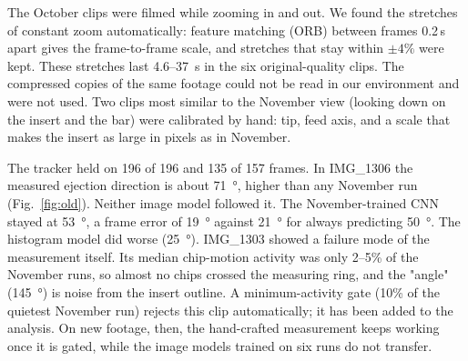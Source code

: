 \documentclass[conference,a4paper]{IEEEtran}
\begin{document}
The October clips were filmed while zooming in and out.
We found the stretches of constant zoom automatically: feature matching (ORB) between frames 0.2\,s apart gives the frame-to-frame scale, and stretches that stay within $\pm4\%$ were kept.
These stretches last 4.6--\SI{37}{s} in the six original-quality clips.
The compressed copies of the same footage could not be read in our environment and were not used.
Two clips most similar to the November view (looking down on the insert and the bar) were calibrated by hand: tip, feed axis, and a scale that makes the insert as large in pixels as in November.

The tracker held on 196 of 196 and 135 of 157 frames.
In IMG\_1306 the measured ejection direction is about \SI{71}{\degree}, higher than any November run (Fig.~\ref{fig:old}).
Neither image model followed it.
The November-trained CNN stayed at \SI{53}{\degree}, a frame error of \SI{19}{\degree} against \SI{21}{\degree} for always predicting \SI{50}{\degree}.
The histogram model did worse (\SI{25}{\degree}).
IMG\_1303 showed a failure mode of the measurement itself.
Its median chip-motion activity was only 2--5\% of the November runs, so almost no chips crossed the measuring ring, and the "angle" (\SI{145}{\degree}) is noise from the insert outline.
A minimum-activity gate (10\% of the quietest November run) rejects this clip automatically; it has been added to the analysis.
On new footage, then, the hand-crafted measurement keeps working once it is gated, while the image models trained on six runs do not transfer.
\end{document}
